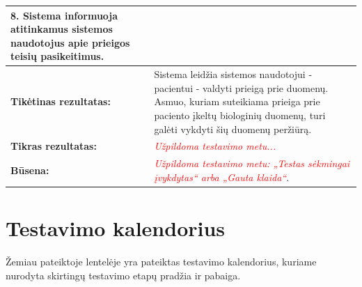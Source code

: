 \documentclass[12pt]{article}
\begin{document}
\begin{table}[htb!]
\begin{tabular}{|m{6cm}|m{11cm}|}
{{            \textbf{8.} {Sistema informuoja atitinkamus
            sistemos naudotojus apie prieigos teisių pasikeitimus.}
        }} \\
        \hline
        \raggedleft \textbf{\cellcolor{deepchampagne}Tikėtinas rezultatas:}
        & Sistema leidžia sistemos naudotojui - pacientui - valdyti prieigą prie
        duomenų. Asmuo, kuriam suteikiama prieiga prie paciento įkeltų
        biologinių duomenų, turi galėti vykdyti šių duomenų peržiūrą. \\
        \hline
        \raggedleft \textbf{\cellcolor{deepchampagne}Tikras rezultatas:}
        & \textcolor{red}{\emph{Užpildoma testavimo metu...}} \\
        \hline
        \raggedleft \textbf{\cellcolor{deepchampagne}Būsena:}
        & \textcolor{red}{\emph{Užpildoma testavimo metu: „Testas sėkmingai
        įvykdytas“ arba „Gauta klaida“}}. \\
        \hline
    \end{tabular}
    \label{table:TS_3}
\end{table}

\newpage


\section{Testavimo kalendorius}
Žemiau pateiktoje lentelėje yra pateiktas testavimo kalendorius, kuriame
nurodyta skirtingų testavimo etapų pradžia ir pabaiga.
\end{document}
